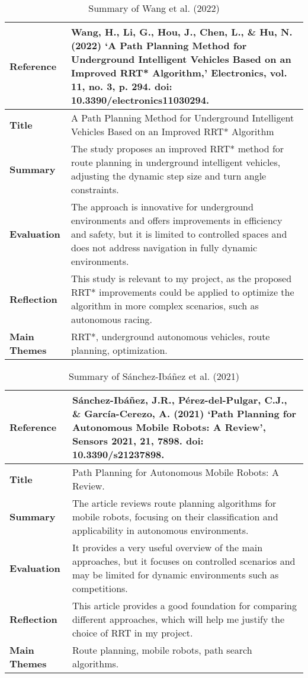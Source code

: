 \documentclass[a4paper,11pt]{report}
\begin{document}
\begin{table}[H]
    \centering
    \begin{tabular}{|p{3cm}|p{10cm}|}
        \hline
        \textbf{Reference} & Wang, H., Li, G., Hou, J., Chen, L., \& Hu, N. (2022) ‘A Path Planning Method for Underground Intelligent Vehicles Based on an Improved RRT* Algorithm,’ Electronics, vol. 11, no. 3, p. 294. doi: 10.3390/electronics11030294. \\ \hline
        \textbf{Title} & A Path Planning Method for Underground Intelligent Vehicles Based on an Improved RRT* Algorithm \\ \hline
        \textbf{Summary} & The study proposes an improved RRT* method for route planning in underground intelligent vehicles, adjusting the dynamic step size and turn angle constraints. \\ \hline
        \textbf{Evaluation} & The approach is innovative for underground environments and offers improvements in efficiency and safety, but it is limited to controlled spaces and does not address navigation in fully dynamic environments. \\ \hline
        \textbf{Reflection} & This study is relevant to my project, as the proposed RRT* improvements could be applied to optimize the algorithm in more complex scenarios, such as autonomous racing. \\ \hline
        \textbf{Main Themes} & RRT*, underground autonomous vehicles, route planning, optimization. \\ \hline
    \end{tabular}
    \caption{Summary of Wang et al. (2022)}
    \label{tab:wang2022}
\end{table}

\begin{table}[H]
    \centering
    \begin{tabular}{|p{3cm}|p{10cm}|}
        \hline
        \textbf{Reference} & Sánchez-Ibáñez, J.R., Pérez-del-Pulgar, C.J., \& García-Cerezo, A. (2021) ‘Path Planning for Autonomous Mobile Robots: A Review’, Sensors 2021, 21, 7898. doi: 10.3390/s21237898. \\ \hline
        \textbf{Title} & Path Planning for Autonomous Mobile Robots: A Review. \\ \hline
        \textbf{Summary} & The article reviews route planning algorithms for mobile robots, focusing on their classification and applicability in autonomous environments. \\ \hline
        \textbf{Evaluation} & It provides a very useful overview of the main approaches, but it focuses on controlled scenarios and may be limited for dynamic environments such as competitions. \\ \hline
        \textbf{Reflection} & This article provides a good foundation for comparing different approaches, which will help me justify the choice of RRT in my project. \\ \hline
        \textbf{Main Themes} & Route planning, mobile robots, path search algorithms. \\ \hline
    \end{tabular}
    \caption{Summary of Sánchez-Ibáñez et al. (2021)}
    \label{tab:sanchez2021}
\end{table}
\end{document}
